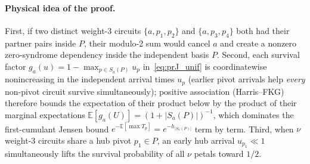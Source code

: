 \documentclass[12pt]{article}
\theoremstyle{definition}
\newcommand{\E}{\mathbb{E}}
\begin{document}
\paragraph{Physical idea of the proof.}
First, if two distinct weight-3 circuits $\{a, p_1, p_2\}$ and $\{a, p_3, p_4\}$ both had their partner pairs
inside $P$, their modulo-2 sum would cancel $a$ and create a nonzero zero-syndrome dependency inside the
independent basis $P$. Second, each survival factor $g_a(u) = 1 - \max_{p \in S_a(P)} u_p$ in~\eqref{eq:prJ_unif}
is coordinatewise nonincreasing in the independent arrival times $u_p$ (earlier pivot arrivals help \emph{every}
non-pivot circuit survive simultaneously); positive association (Harris--FKG) therefore bounds the expectation of
their product below by the product of their marginal expectations $\E[g_a(U)] = (1 + |S_a(P)|)^{-1}$, which
dominates the first-cumulant Jensen bound $e^{-\E[\max T_p]} = e^{-h_{|S_a(P)|}}$ term by term. Third, when $\nu$
weight-3 circuits share a hub pivot $p_1 \in P$, an early hub arrival $u_{p_1} \ll 1$ simultaneously lifts the
survival probability of all $\nu$ petals toward $1/2$.
\end{document}
